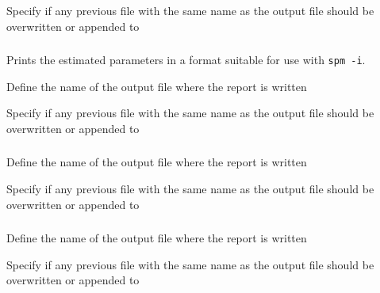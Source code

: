  {Specify if any previous file with the same name as the output file should be overwritten or appended to}

\subsubsection[Printing the estimated parameter values out as a vector]{\label{sec:InputFileFormat}}

Prints the estimated parameters in a format suitable for use with \texttt{spm -i}.

 {Define the name of the output file where the report is written}

 {Specify if any previous file with the same name as the output file should be overwritten or appended to}

\subsubsection[Print the objective function values]{}

 {Define the name of the output file where the report is written}

 {Specify if any previous file with the same name as the output file should be overwritten or appended to}

\subsubsection[Print the covariance matrix]{}

 {Define the name of the output file where the report is written}

 {Specify if any previous file with the same name as the output file should be overwritten or appended to}

